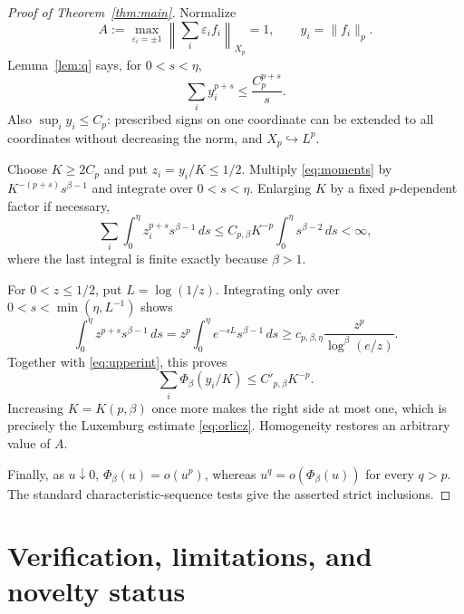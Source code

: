 \documentclass[11pt]{article}
\newcommand{\eps}{\varepsilon}
\begin{document}
\begin{proof}[Proof of Theorem~\ref{thm:main}]
Normalize
\[
 A:=\max_{\eps_i=\pm1}\left\|\sum_i\eps_i f_i\right\|_{X_p}=1,
 \qquad y_i=\|f_i\|_p.
\]
Lemma~\ref{lem:q} says, for $0<s<\eta$,
\begin{equation}\label{eq:moments}
 \sum_i y_i^{p+s}\le \frac{C_p^{p+s}}{s}.
\end{equation}
Also $\sup_i y_i\le C_p$: prescribed signs on one coordinate can be extended
to all coordinates without decreasing the norm, and $X_p\hookrightarrow L^p$.

Choose $K\ge2C_p$ and put $z_i=y_i/K\le1/2$.  Multiply
\eqref{eq:moments} by $K^{-(p+s)}s^{\beta-1}$ and integrate over
$0<s<\eta$.  Enlarging $K$ by a fixed $p$-dependent factor if necessary,
\begin{equation}\label{eq:upperint}
 \sum_i\int_0^\eta z_i^{p+s}s^{\beta-1}\,ds
 \le C_{p,\beta}K^{-p}\int_0^\eta s^{\beta-2}\,ds
 <\infty,
\end{equation}
where the last integral is finite exactly because $\beta>1$.

For $0<z\le1/2$, put $L=\log(1/z)$.  Integrating only over
$0<s<\min(\eta,L^{-1})$ shows
\[
 \int_0^\eta z^{p+s}s^{\beta-1}\,ds
 =z^p\int_0^\eta e^{-sL}s^{\beta-1}\,ds
 \ge c_{p,\beta,\eta}\frac{z^p}{\log^\beta(e/z)}.
\]
Together with \eqref{eq:upperint}, this proves
\[
 \sum_i\Phi_\beta(y_i/K)\le C'_{p,\beta}K^{-p}.
\]
Increasing $K=K(p,\beta)$ once more makes the right side at most one, which
is precisely the Luxemburg estimate \eqref{eq:orlicz}.  Homogeneity restores
an arbitrary value of $A$.

Finally, as $u\downarrow0$,
$\Phi_\beta(u)=o(u^p)$, whereas $u^q=o(\Phi_\beta(u))$ for every $q>p$.
The standard characteristic-sequence tests give the asserted strict
inclusions.
\end{proof}

\section{Verification, limitations, and novelty status}
\end{document}
